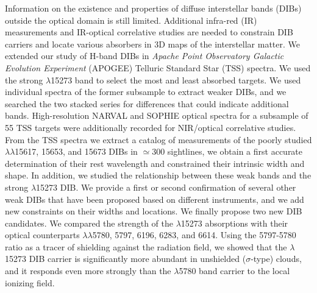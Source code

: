 \documentclass[printer]{aa} %
\begin{document}
\date{Received 18 November 2016; accepted 25 January 2017}
\abstract
{}{Information on the existence and properties of diffuse interstellar 
bands (DIBs) outside the optical domain is still
limited. Additional infra-red (IR) measurements and IR-optical correlative studies are needed to constrain DIB carriers and locate various absorbers in 3D maps of the interstellar matter.}
{We extended our study of H-band DIBs in \emph{Apache Point Observatory Galactic Evolution Experiment} (APOGEE) Telluric Standard Star (TSS) spectra. We used the strong $\lambda$15273 band to select the most and 
least absorbed targets. We used individual spectra of the former 
subsample to extract weaker DIBs, and we searched the two stacked series
for differences that could indicate additional bands. High-resolution NARVAL and SOPHIE optical spectra for a subsample of 55 TSS targets were additionally recorded for NIR/optical correlative studies.}
{From the TSS spectra we extract a catalog of measurements of the poorly studied $\lambda\lambda$15617, 15653, and 15673 DIBs in $\simeq$300 sightlines, we obtain a first accurate determination of their rest wavelength and constrained their intrinsic width and shape. In addition, we studied the relationship between these weak bands and the strong $\lambda$15273 DIB. We provide a first or second confirmation of several other weak DIBs that have been proposed based on different instruments, and we add new constraints on their widths and locations. We finally propose two new DIB candidates.}
{We compared the strength of the $\lambda$15273 absorptions with their optical counterparts $\lambda\lambda$5780, 5797, 6196, 6283, and 6614. Using the 5797-5780 ratio as a tracer of shielding against the radiation field, we showed that the $\lambda$15273 DIB carrier is significantly more abundant in unshielded ($\sigma$-type) clouds, and it responds even more strongly than the $\lambda$5780 band carrier to the local ionizing field.}


\maketitle
\end{document}
